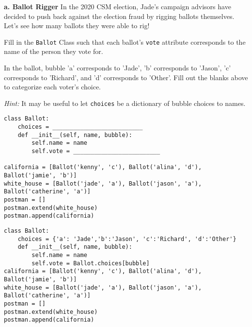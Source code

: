 \begin{blocksection}
\question
\textbf{a. Ballot Rigger} In the 2020 CSM election, Jade's campaign advisors have decided to push back against the election fraud by rigging ballots themselves. Let's see how many ballots they were able to rig!

Fill in the \texttt{Ballot} Class such that each ballot's \texttt{vote} attribute corresponds to the name of the person they vote for.

In the ballot, bubble 'a' corresponds to 'Jade', 'b' corresponds to 'Jason', 'c' corresponds to 'Richard', and 'd' corresponds to 'Other'. Fill out the blanks above to categorize each voter's choice.

\emph{Hint:} It may be useful to let \texttt{choices} be a dictionary of bubble choices to names.

\begin{lstlisting}
class Ballot:
    choices = __________________________ 
    def __init__(self, name, bubble):
        self.name = name
        self.vote = _________________________

california = [Ballot('kenny', 'c'), Ballot('alina', 'd'), Ballot('jamie', 'b')]
white_house = [Ballot('jade', 'a'), Ballot('jason', 'a'), Ballot('catherine', 'a')]
postman = []
postman.extend(white_house)
postman.append(california)
\end{lstlisting}

\begin{solution}[1in]
\begin{lstlisting}
class Ballot:
    choices = {'a': 'Jade','b':'Jason', 'c':'Richard', 'd':'Other'}
    def __init__(self, name, bubble):
        self.name = name
        self.vote = Ballot.choices[bubble]
california = [Ballot('kenny', 'c'), Ballot('alina', 'd'), Ballot('jamie', 'b')]
white_house = [Ballot('jade', 'a'), Ballot('jason', 'a'), Ballot('catherine', 'a')]
postman = []
postman.extend(white_house)
postman.append(california)
\end{lstlisting}
\end{solution}
\end{blocksection}

